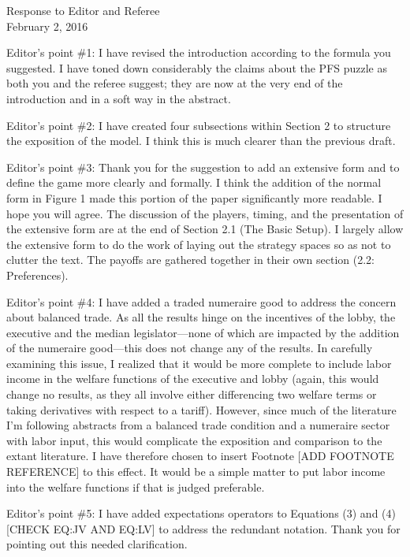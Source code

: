 \documentclass[12pt]{article}
\begin{document}
\begin{center}
\large Response to Editor and Referee \\
\normalsize February 2, 2016
\end{center}

Editor's point $\#$1: I have revised the introduction according to the formula you suggested. I have toned down considerably the claims about the PFS puzzle as both you and the referee suggest; they are now at the very end of the introduction and in a soft way in the abstract.

Editor's point $\#$2: I have created four subsections within Section 2 to structure the exposition of the model. I think this is much clearer than the previous draft.

Editor's point $\#$3: Thank you for the suggestion to add an extensive form and to define the game more clearly and formally. I think the addition of the normal form in Figure 1 made this portion of the paper significantly more readable. I hope you will agree. The discussion of the players, timing, and the presentation of the extensive form are at the end of Section 2.1 (The Basic Setup). I largely allow the extensive form to do the work of laying out the strategy spaces so as not to clutter the text. The payoffs are gathered together in their own section (2.2: Preferences).

Editor's point $\#$4: I have added a traded numeraire good to address the concern about balanced trade. As all the results hinge on the incentives of the lobby, the executive and the median legislator---none of which are impacted by the addition of the numeraire good---this does not change any of the results. In carefully examining this issue, I realized that it would be more complete to include labor income in the welfare functions of the executive and lobby (again, this would change no results, as they all involve either differencing two welfare terms or taking derivatives with respect to a tariff). However, since much of the literature I'm following abstracts from a balanced trade condition and a numeraire sector with labor input, this would complicate the exposition and comparison to the extant literature. I have therefore chosen to insert Footnote [{\color{blue}ADD FOOTNOTE REFERENCE}] to this effect. It would be a simple matter to put labor income into the welfare functions if that is judged preferable.

Editor's point $\#$5: I have added expectations operators to Equations (3) and (4) [{\color{blue}CHECK EQ:JV AND EQ:LV}] to address the redundant notation. Thank you for pointing out this needed clarification.
\end{document}
